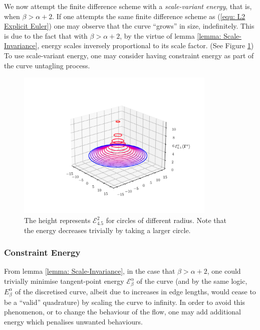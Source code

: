 \documentclass[../dissertation.tex]{subfiles}
\begin{document}
We now attempt the finite difference scheme with a \textit{scale-variant energy}, that is, when $\beta > \alpha + 2$. 
If one attempts the same finite difference scheme as (\ref{equ: L2 Explicit Euler})
one may observe that the curve ``grows'' in size, indefinitely.
This is due to the fact that with $\beta > \alpha + 2$,
by the virtue of lemma \ref{lemma: Scale-Invariance},
energy scales inversely proportional to its scale factor.
(See Figure \ref{fig: Scale Variant})
To use scale-variant energy, one may consider having constraint energy as part of the curve untagling process.
\begin{figure}[tbp]
    \centering
    \includegraphics[width=0.85\textwidth]{sections/unknottingCurveImgs/scaleVariant}
    \caption{The height represents $\mathcal{E}_{4.5}^{2}$ for circles of different radius. Note that the energy decreases trivially by taking a larger circle.}
    \label{fig: Scale Variant}
\end{figure}
\subsubsection{Constraint Energy}
\label{sct: Constraint Energy}
From lemma \ref{lemma: Scale-Invariance}, in the case that $\beta > \alpha + 2$,
one could trivially minimise tangent-point energy $\mathcal{E}_{\beta}^{\alpha}$ of the curve 
(and by the same logic, $E_{\beta}^{\alpha}$ of the discretised curve, albeit due to increases in edge lengths, would cease to be a ``valid'' quadrature)
by scaling the curve to infinity.
In order to avoid this phenomenon, or to change the behaviour of the flow, one may add additional energy which penalises unwanted behaviours.
\end{document}
